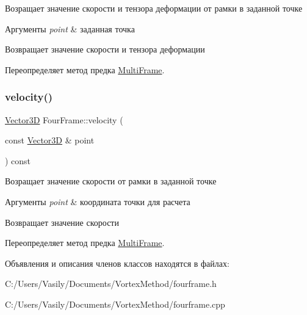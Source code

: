 Возращает значение скорости и тензора деформации от рамки в заданной точке 
\begin{DoxyParams}{Аргументы}
{\em point} & заданная точка \\
\hline
\end{DoxyParams}
\begin{DoxyReturn}{Возвращает}
значение скорости и тензора деформации 
\end{DoxyReturn}


Переопределяет метод предка \mbox{\hyperlink{class_multi_frame_a60269c2c56aace32bb0fe0a70731a309}{Multi\+Frame}}.

\mbox{\label{class_four_frame_a0127ebf5b1fd643a590006afdf395e30}} 
\subsubsection{\texorpdfstring{velocity()}{velocity()}}
{\footnotesize\ttfamily \mbox{\hyperlink{class_vector3_d}{Vector3D}} Four\+Frame\+::velocity (\begin{DoxyParamCaption}\item[{const \mbox{\hyperlink{class_vector3_d}{Vector3D}} \&}]{point }\end{DoxyParamCaption}) const\hspace{0.3cm}{\ttfamily [virtual]}}

Возращает значение скорости от рамки в заданной точке 
\begin{DoxyParams}{Аргументы}
{\em point} & координата точки для расчета \\
\hline
\end{DoxyParams}
\begin{DoxyReturn}{Возвращает}
значение скорости 
\end{DoxyReturn}


Переопределяет метод предка \mbox{\hyperlink{class_multi_frame_a18a1755403fa12c2f59e81078e1dd34e}{Multi\+Frame}}.



Объявления и описания членов классов находятся в файлах\+:\begin{DoxyCompactItemize}
\item 
C\+:/\+Users/\+Vasily/\+Documents/\+Vortex\+Method/fourframe.\+h\item 
C\+:/\+Users/\+Vasily/\+Documents/\+Vortex\+Method/fourframe.\+cpp\end{DoxyCompactItemize}
